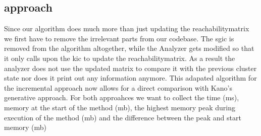\subsection{approach} \label{exp1:approach}
Since our algorithm does much more than just updating the reachabilitymatrix we first have to remove the irrelevant parts from our codebase. The \acrlong{sgic} is removed from the algorithm altogether, while the Analyzer gets modified so that it only calls upon the \acrlong{kic} to update the reachabilitymatrix. As a result the analyzer does not use the updated matrix to compare it with the previous cluster state nor does it print out any information anymore. This adapated algorithm for the incremental approach now allows for a direct comparison with Kano's generative approach.  For both approahces we want to collect the time (ms), memory at the start of the method (mb), the highest memory peak during execution of the method (mb) and  the difference between the peak and start memory (mb)
\\[10pt]

